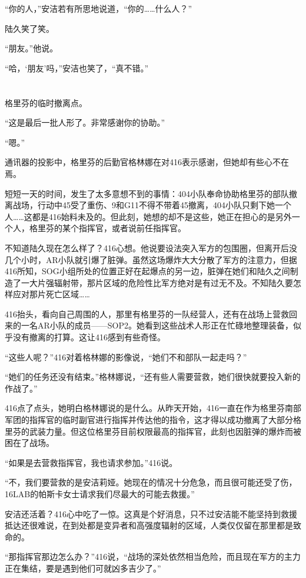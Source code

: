“你的人，”安洁若有所思地说道，“你的……什么人？”

陆久笑了笑。

“朋友。”他说。

“哈，‘朋友’吗，”安洁也笑了，“真不错。”

\section*{}

格里芬的临时撤离点。

“这是最后一批人形了。非常感谢你的协助。”

“嗯。”

通讯器的投影中，格里芬的后勤官格林娜在对416表示感谢，但她却有些心不在焉。

短短一天的时间，发生了太多意想不到的事情：404小队奉命协助格里芬的部队撤离战场，行动中45受了重伤、9和G11不得不带着45撤离，404小队只剩下她一个人……这都是416始料未及的。但此刻，她想的却不是这些，她正在担心的是另外一个人，格里芬的某个指挥官，或者说前任指挥官。

不知道陆久现在怎么样了？416心想。他说要设法突入军方的包围圈，但离开后没几个小时，AR小队就引爆了脏弹。虽然这场爆炸大大分散了军方的注意力，但据416所知，SOG小组所处的位置正好在起爆点的另一边，脏弹在她们和陆久之间制造了一大片强辐射带，那片区域的危险性比军方绝对是有过无不及。不知陆久要怎样应对那片死亡区域……

416抬头，看向自己周围的人，那里有格里芬的一队经营人，还有在战场上营救回来的一名AR小队的成员——SOP2。她看到这些战术人形正在忙碌地整理装备，似乎没有撤离的打算。这让416感到有些奇怪。

“这些人呢？”416对着格林娜的影像说，“她们不和部队一起走吗？”

“她们的任务还没有结束。”格林娜说，“还有些人需要营救，她们很快就要投入新的作战了。”

416点了点头，她明白格林娜说的是什么。从昨天开始，416一直在作为格里芬南部军团的指挥官的临时副官进行指挥并传达他的指令，这才得以成功撤离了大部分格里芬的武装力量。但这位格里芬目前权限最高的指挥官，此刻也因脏弹的爆炸而被困在了战场。

“如果是去营救指挥官，我也请求参加。”416说。

“不，我们要营救的是安洁莉娅。她现在的情况十分危急，而且很可能还受了伤，16LAB的帕斯卡女士请求我们尽最大的可能去救援。”

安洁还活着？416心中吃了一惊。这真是个好消息，只不过安洁能不能坚持到救援抵达还很难说，在到处都是变异者和高强度辐射的区域，人类仅仅留在那里都是致命的。

“那指挥官那边怎么办？”416说，“战场的深处依然相当危险，而且现在军方的主力正在集结，要是遇到他们可就凶多吉少了。”

